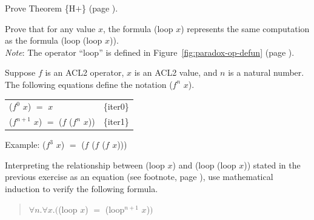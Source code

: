 \begin{ExerciseList}
\Exercise Prove Theorem \{H$+$\} (page \pageref{thm:HplusHminus}).

\Exercise
Prove that for any value $x$, the formula
(loop $x$) represents
the same computation as the formula (loop (loop $x$)).\\
\emph{Note}: The operator ``loop'' is defined in
Figure~\ref{fig:paradox-op-defun} (page \pageref{fig:paradox-op-defun}).

\Exercise
Suppose $f$ is an ACL2 operator, $x$ is an ACL2 value,
and $n$ is a natural number.
The following equations define the notation ($f^n$ $x$).
\begin{center}
\begin{tabular}{ll}
($f^0$ $x$) $=$ $x$                    &\{iter0\} \\
($f^{n+1}$ $x$) $=$ ($f$ ($f^n$ $x$))  &\{iter1\} \\
\end{tabular}
Example: ($f^3$ $x$) $=$ ($f$ ($f$ ($f$ $x$)))
\end{center}
Interpreting the relationship between (loop $x$) and (loop (loop $x$))
stated in the previous exercise
as an equation (see footnote, page \pageref{caveat:equality-for-loop}),
use mathematical induction to verify the following formula.
\begin{quote}
$\forall n.\forall x.($(loop $x$) $=$ (loop$^{n+1}$ $x$)$)$
\end{quote}

\end{ExerciseList}

